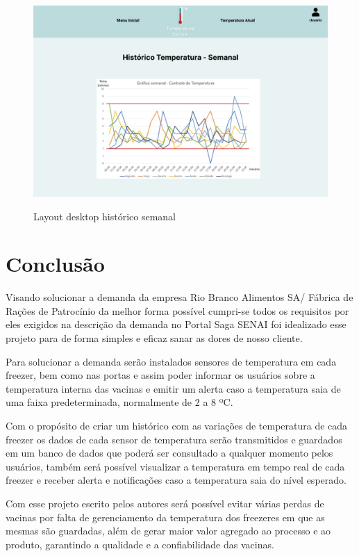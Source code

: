 \documentclass[hidelinks, 12pt, a4paper, brazil, oneside]{abntex2}
\begin{document}
    \begin{figure}[ht]
        \caption{Layout desktop histórico semanal}
        \centering
        \includegraphics[scale=0.35]{img/desktop/temp_semanal.jpeg}
        \label{fig:desktopTempSemanal}
    \end{figure}


\chapter{Conclusão}

    Visando solucionar a demanda da empresa
    Rio Branco Alimentos SA/ Fábrica de Rações de Patrocínio
    da melhor forma possível cumpri-se todos os requisitos 
    por eles exigidos na descrição da demanda no Portal Saga SENAI
    foi idealizado esse projeto para de forma simples e eficaz 
    sanar as dores de nosso cliente.

    Para solucionar a demanda serão instalados sensores de 
    temperatura em cada freezer, bem como nas portas
    e assim poder informar os usuários sobre a temperatura
    interna das vacinas e emitir um alerta caso a temperatura
    saia de uma faixa predeterminada, normalmente de 2 a 8 ºC.

    Com o propósito de criar um histórico com as variações de 
    temperatura de cada freezer os dados de cada sensor de 
    temperatura serão transmitidos e guardados em um 
    banco de dados que poderá ser consultado a qualquer momento
    pelos usuários, também será possível visualizar a temperatura
    em tempo real de cada freezer e receber alerta e notificações
    caso a temperatura saia do nível esperado.

    Com esse projeto escrito pelos autores 
    será possível evitar várias perdas de vacinas por 
    falta de gerenciamento da temperatura dos freezeres
    em que as mesmas são guardadas, além de gerar maior valor 
    agregado ao processo e ao produto, garantindo 
    a qualidade e a confiabilidade das vacinas.
\end{document}
